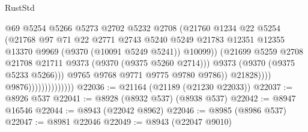 \begin{lexlean}{RustStd}
\begin{coremodule}
                                              @69
                                              @5254
                                              @5266
                                              @5273
                                              @2702
                                              @5232
                                              @2708
                                              (@21760
                                                @1234
                                                @22
                                                @5254
                                                (@21768
                                                  @97
                                                  @71
                                                  @22
                                                  @2771
                                                  @2743
                                                  @5240
                                                  @5249
                                                  @21783
                                                  @12351
                                                  @12355
                                                  @13370
                                                  @9969
                                                  (@9370 (@10091 @5249 @5241))
                                                  @10099))
                                              (@21699
                                                @5259
                                                @2708
                                                @21708
                                                @21711
                                                @9373
                                                (@9370 (@9375 @5260 @2714)))
                                              @9373
                                              (@9370 (@9375 @5233 @5266)))
                                            @9765
                                            @9768
                                            @9771
                                            @9775
                                            @9780
                                            @9786))
                                        @21828))))
                                @9876))))))))))))))
@22036 := @21164 (@21189 (@21230 @22033))
@22037 := @8926 @537
@22041 := @8928 (@8932 @537) (@8938 @537)
@22042 := @8947 @16546
@22044 := @8943 (@22042 @8962)
@22046 := @8985 (@8986 @537)
@22047 := @8981 @22046
@22049 := @8943 (@22047 @9010)

\end{coremodule}
\end{lexlean}
